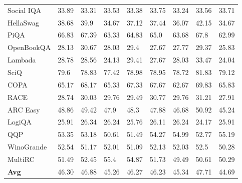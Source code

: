 \documentclass{article}
\theoremstyle{definition}
\theoremstyle{remark}
\begin{document}
\begin{table}[!ht]
\begin{tabular}{lllllllll}
        Social IQA & 33.89 & 33.31 & 33.53 & 33.38 & 33.75 & 33.24 & 33.56 & 33.71 \\ 
        HellaSwag & 38.68 & 39.9 & 34.67 & 37.12 & 37.44 & 36.07 & 42.15 & 34.67 \\ 
        PiQA & 66.83 & 67.39 & 63.33 & 64.83 & 65.0 & 63.68 & 67.8 & 62.99 \\ 
        OpenBookQA & 28.13 & 30.67 & 28.03 & 29.4 & 27.67 & 27.77 & 29.37 & 25.83 \\ 
        Lambada & 28.78 & 28.56 & 24.13 & 29.41 & 27.67 & 28.03 & 33.47 & 24.04 \\ 
        SciQ & 79.6 & 78.83 & 77.42 & 78.98 & 78.95 & 78.72 & 81.83 & 79.12 \\ 
        COPA & 65.17 & 68.17 & 65.33 & 67.33 & 67.67 & 62.67 & 69.83 & 65.83 \\ 
        RACE & 28.74 & 30.03 & 29.76 & 29.49 & 30.77 & 29.76 & 31.21 & 27.91 \\ 
        ARC Easy & 48.86 & 49.42 & 47.9 & 48.3 & 47.88 & 46.68 & 50.92 & 45.24 \\ 
        LogiQA & 25.91 & 26.34 & 26.24 & 25.76 & 26.11 & 26.24 & 24.17 & 25.91 \\ 
        QQP & 53.35 & 53.18 & 50.61 & 51.49 & 54.27 & 54.99 & 52.77 & 55.19 \\ 
        WinoGrande & 52.54 & 51.17 & 52.01 & 51.09 & 52.13 & 52.03 & 52.5 & 50.28 \\ 
        MultiRC & 51.49 & 52.45 & 55.4 & 54.87 & 51.73 & 49.49 & 50.61 & 50.29 \\ 
        \midrule
        \textbf{Avg} & 46.30 & 46.88 & 45.26 & 46.27 & 46.23 & 45.34 & 47.71 & 44.69 \\ \bottomrule 
    \end{tabular}
\end{table}
\end{document}
